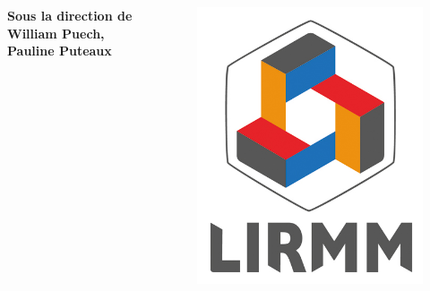 \documentclass{beamer}
\begin{document}
\begin{frame}[t]
\begin{block}{}
\begin{columns}[t]
\begin{column}{.75\linewidth}
\begin{columns}[t]
                        \begin{column}{.5\linewidth}
                            \begin{center}
                                \textbf{Sous la direction de\\William Puech, Pauline Puteaux}
                            \end{center}
                        \end{column}
                    \end{columns}
                \end{column}

                \begin{column}{.1\linewidth}
                    \begin{figure}[t]
                        \includegraphics[width=\linewidth]{rsc/logo_lirmm.png}
                    \end{figure}
                \end{column}
            \end{columns}
        \end{block}


\end{frame}
\end{document}
